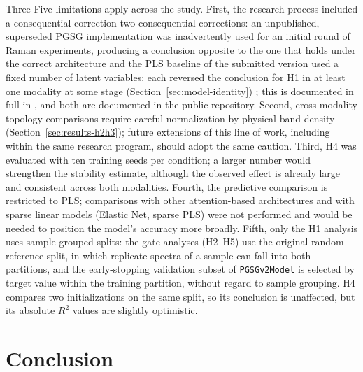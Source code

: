 \documentclass[preprint,12pt]{elsarticle}
\providecommand{\DIFaddtex}[1]{{\protect\color{blue} \sf #1}} %
\providecommand{\DIFdeltex}[1]{{\protect\color{red} \scriptsize #1}} %
\providecommand{\DIFaddbegin}{} %
\providecommand{\DIFaddend}{} %
\providecommand{\DIFdelbegin}{} %
\providecommand{\DIFdelend}{} %
\providecommand{\DIFadd}[1]{\texorpdfstring{\DIFaddtex{#1}}{#1}} %
\providecommand{\DIFdel}[1]{\texorpdfstring{\DIFdeltex{#1}}{}} %
\providecommand{\DIFscaledelfig}{0.5}
\newlength{\DIFdelgraphicswidth} %
\newlength{\DIFdelgraphicsheight} %
\providecommand{\DIFaddincludegraphics}[2][]{{\color{blue}\fbox{\DIFOincludegraphics[#1]{#2}}}} %
\providecommand{\DIFdelincludegraphics}[2][]{%
\sbox{\DIFdelgraphicsbox}{\DIFOincludegraphics[#1]{#2}}%
\settoboxwidth{\DIFdelgraphicswidth}{\DIFdelgraphicsbox} %
\settoboxtotalheight{\DIFdelgraphicsheight}{\DIFdelgraphicsbox} %
\scalebox{\DIFscaledelfig}{%
\parbox[b]{\DIFdelgraphicswidth}{\usebox{\DIFdelgraphicsbox}\\[-\baselineskip] \rule{\DIFdelgraphicswidth}{0em}}\llap{\resizebox{\DIFdelgraphicswidth}{\DIFdelgraphicsheight}{%
\setlength{\unitlength}{\DIFdelgraphicswidth}%
\begin{picture}(1,1)%
\thicklines\linethickness{2pt} %
{\color[rgb]{1,0,0}\put(0,0){\framebox(1,1){}}}%
{\color[rgb]{1,0,0}\put(0,0){\line( 1,1){1}}}%
{\color[rgb]{1,0,0}\put(0,1){\line(1,-1){1}}}%
\end{picture}%
}\hspace*{3pt}}} %
} %
\DeclareRobustCommand{\DIFaddbegin}{\DIFOaddbegin \let\includegraphics\DIFaddincludegraphics} %
\DeclareRobustCommand{\DIFaddend}{\DIFOaddend \let\includegraphics\DIFOincludegraphics} %
\DeclareRobustCommand{\DIFdelbegin}{\DIFOdelbegin \let\includegraphics\DIFdelincludegraphics} %
\DeclareRobustCommand{\DIFdelend}{\DIFOaddend \let\includegraphics\DIFOincludegraphics} %
\begin{document}
\DIFdelbegin \DIFdel{Three }\DIFdelend \DIFaddbegin \DIFadd{Five }\DIFaddend limitations apply across the study. First, the research process included \DIFdelbegin \DIFdel{a consequential correction}\DIFdelend \DIFaddbegin \DIFadd{two consequential corrections}\DIFaddend : an unpublished, superseded PGSG implementation was inadvertently used for an initial round of Raman experiments, \DIFdelbegin \DIFdel{producing a conclusion opposite to the one that holds under the correct architecture }\DIFdelend \DIFaddbegin \DIFadd{and the PLS baseline of the submitted version used a fixed number of latent variables; each reversed the conclusion for H1 in at least one modality at some stage }\DIFaddend (Section~\ref{sec:model-identity})\DIFdelbegin \DIFdel{; this is documented in full in }\DIFdelend \DIFaddbegin \DIFadd{, and both are documented in }\DIFaddend the public repository. Second, cross-modality topology comparisons require careful normalization by physical band density (Section~\ref{sec:results-h2h3}); future extensions of this line of work, including within the same research program, should adopt the same caution. Third, H4 was evaluated with ten training seeds per condition; a larger number would strengthen the stability estimate, although the observed effect is already large and consistent across both modalities. \DIFaddbegin \DIFadd{Fourth, the predictive comparison is restricted to PLS; comparisons with other attention-based architectures and with sparse linear models (Elastic Net, sparse PLS) were not performed and would be needed to position the model's accuracy more broadly. Fifth, only the H1 analysis uses sample-grouped splits: the gate analyses (H2--H5) use the original random reference split, in which replicate spectra of a sample can fall into both partitions, and the early-stopping validation subset of \texttt{PGSGv2Model} is selected by target value within the training partition, without regard to sample grouping. H4 compares two initializations on the same split, so its conclusion is unaffected, but its absolute $R^{2}$ values are slightly optimistic.
}\DIFaddend 

\section{Conclusion}
\end{document}
